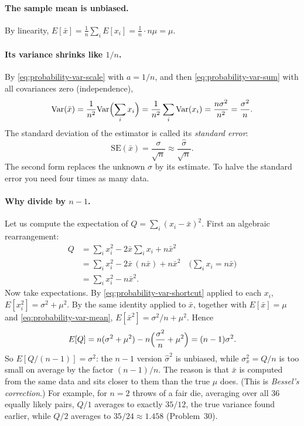 \paragraph{The sample mean is unbiased.} By linearity, $E[\bar x]=\frac1n\sum_i E[x_i]=\frac1n\cdot n\mu=\mu$.

\paragraph{Its variance shrinks like $1/n$.} By \cref{eq:probability-var-scale} with $a=1/n$, and then \cref{eq:probability-var-sum} with all covariances zero (independence),
\begin{equation}
\mathrm{Var}(\bar x)=\frac{1}{n^2}\mathrm{Var}\Bigl(\sum_i x_i\Bigr)=\frac1{n^2}\sum_i\mathrm{Var}(x_i)=\frac{n\sigma^2}{n^2}=\frac{\sigma^2}{n}.
\label{eq:probability-var-mean}
\end{equation}
The standard deviation of the estimator is called its \emph{standard error}:
\begin{equation}
\mathrm{SE}(\bar x)=\frac{\sigma}{\sqrt n}\approx\frac{\hat\sigma}{\sqrt n}.
\label{eq:probability-se}
\end{equation}
The second form replaces the unknown $\sigma$ by its estimate. To halve the standard error you need four times as many data.

\paragraph{Why divide by $n-1$.} Let us compute the expectation of $Q=\sum_i(x_i-\bar x)^2$. First an algebraic rearrangement:
\begin{align*}
Q&=\sum_i x_i^2-2\bar x\sum_i x_i+n\bar x^2\\
&=\sum_i x_i^2 - 2\bar x\,(n\bar x) + n\bar x^2 \quad\text{($\sum_i x_i=n\bar x$)}\\
&=\sum_i x_i^2-n\bar x^2 .
\end{align*}
Now take expectations. By \cref{eq:probability-var-shortcut} applied to each $x_i$, $E[x_i^2]=\sigma^2+\mu^2$. By the same identity applied to $\bar x$, together with $E[\bar x]=\mu$ and \cref{eq:probability-var-mean}, $E[\bar x^2]=\sigma^2/n+\mu^2$. Hence
\[
E[Q]=n(\sigma^2+\mu^2)-n\Bigl(\frac{\sigma^2}{n}+\mu^2\Bigr)=(n-1)\sigma^2 .
\]
So $E[Q/(n-1)]=\sigma^2$: the $n-1$ version $\hat\sigma^2$ is unbiased, while $\sigma_x^2=Q/n$ is too small on average by the factor $(n-1)/n$. The reason is that $\bar x$ is computed from the same data and sits closer to them than the true $\mu$ does. (This is \emph{Bessel's correction}.) For example, for $n=2$ throws of a fair die, averaging over all 36 equally likely pairs, $Q/1$ averages to exactly $35/12$, the true variance found earlier, while $Q/2$ averages to $35/24\approx1.458$ (Problem~30).

